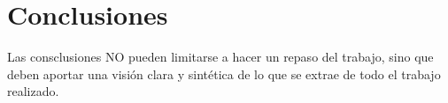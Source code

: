 \chapter{Conclusiones}

Las consclusiones NO pueden limitarse a hacer un repaso del trabajo, sino que deben aportar una visión clara y sintética de lo que se extrae de todo el trabajo realizado.